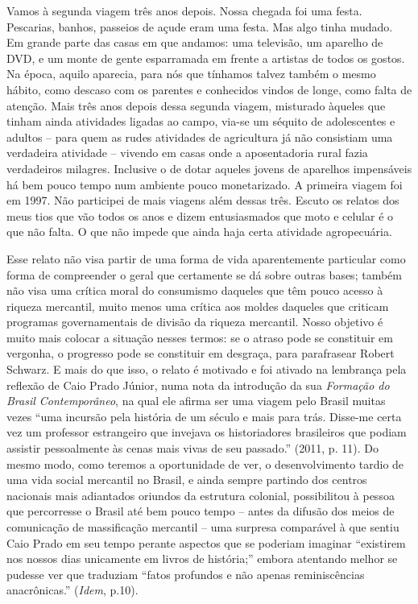 Vamos à segunda viagem três anos depois. Nossa chegada foi uma festa.
Pescarias, banhos, passeios de açude eram uma festa. Mas algo tinha
mudado. Em grande parte das casas em que andamos: uma televisão, um
aparelho de DVD, e um monte de gente esparramada em frente a artistas de
todos os gostos. Na época, aquilo aparecia, para nós que tínhamos talvez
também o mesmo hábito, como descaso com os parentes e conhecidos vindos
de longe, como falta de atenção. Mais três anos depois dessa segunda
viagem, misturado àqueles que tinham ainda atividades ligadas ao campo,
via-se um séquito de adolescentes e adultos -- para quem as rudes
atividades de agricultura já não consistiam uma verdadeira atividade --
vivendo em casas onde a aposentadoria rural fazia verdadeiros milagres.
Inclusive o de dotar aqueles jovens de aparelhos impensáveis há bem
pouco tempo num ambiente pouco monetarizado. A primeira viagem foi em
1997. Não participei de mais viagens além dessas três. Escuto os relatos
dos meus tios que vão todos os anos e dizem entusiasmados que moto e
celular é o que não falta. O que não impede que ainda haja certa
atividade agropecuária.

Esse relato não visa partir de uma forma de vida aparentemente
particular como forma de compreender o geral que certamente se dá sobre
outras bases; também não visa uma crítica moral do consumismo daqueles
que têm pouco acesso à riqueza mercantil, muito menos uma crítica aos
moldes daqueles que criticam programas governamentais de divisão da
riqueza mercantil. Nosso objetivo é muito mais colocar a situação nesses
termos: se o atraso pode se constituir em vergonha, o progresso pode se
constituir em desgraça, para parafrasear Robert Schwarz. E mais do que
isso, o relato é motivado e foi ativado na lembrança pela reflexão de
Caio Prado Júnior, numa nota da introdução da sua \emph{Formação do
Brasil Contemporâneo}, na qual ele afirma ser uma viagem pelo Brasil
muitas vezes ``uma incursão pela história de um século e mais para trás.
Disse-me certa vez um professor estrangeiro que invejava os
historiadores brasileiros que podiam assistir pessoalmente às cenas mais
vivas de seu passado.'' (2011, p. 11). Do mesmo modo, como teremos a
oportunidade de ver, o desenvolvimento tardio de uma vida social
mercantil no Brasil, e ainda sempre partindo dos centros nacionais mais
adiantados oriundos da estrutura colonial, possibilitou à pessoa que
percorresse o Brasil até bem pouco tempo -- antes da difusão dos meios
de comunicação de massificação mercantil -- uma surpresa comparável à
que sentiu Caio Prado em seu tempo perante aspectos que se poderiam
imaginar ``existirem nos nossos dias unicamente em livros de história;''
embora atentando melhor se pudesse ver que traduziam ``fatos profundos e
não apenas reminiscências anacrônicas.'' (\emph{Idem}, p.10).

